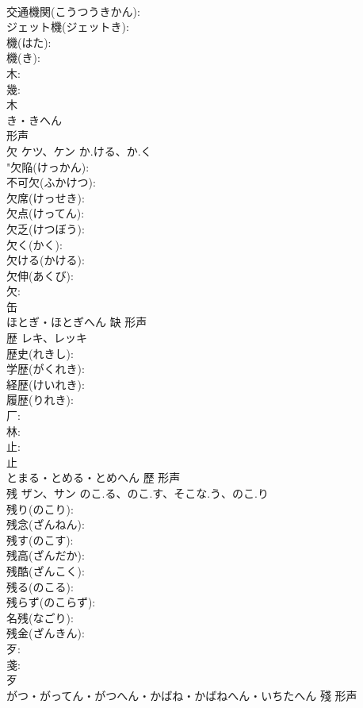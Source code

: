 \documentclass[8pt]{extreport}
\begin{document}
\begin{CJK}{UTF8}{min}
\\	交通機関(こうつうきかん): 
\\	ジェット機(ジェットき): 
\\	機(はた): 
\\	機(き): 
\\	木: 
\\	幾: 
\\	木	
\\	き・きへん	
\\	形声 
\\	欠	ケツ、ケン	か.ける、か.く		
\\	"欠陥(けっかん): 
\\	不可欠(ふかけつ): 
\\	欠席(けっせき): 
\\	欠点(けってん): 
\\	欠乏(けつぼう): 
\\	欠く(かく): 
\\	欠ける(かける): 
\\	欠伸(あくび): 
\\	欠: 
\\	缶	
\\	ほとぎ・ほとぎへん	缺	形声 
\\	歴	レキ、レッキ			
\\	歴史(れきし): 
\\	学歴(がくれき): 
\\	経歴(けいれき): 
\\	履歴(りれき): 
\\	厂: 
\\	林: 
\\	止: 
\\	止	
\\	とまる・とめる・とめへん	歷	形声 
\\	残	ザン、サン	のこ.る、のこ.す、そこな.う、のこ.り		
\\	残り(のこり): 
\\	残念(ざんねん): 
\\	残す(のこす): 
\\	残高(ざんだか): 
\\	残酷(ざんこく): 
\\	残る(のこる): 
\\	残らず(のこらず): 
\\	名残(なごり): 
\\	残金(ざんきん): 
\\	歹: 
\\	戔: 
\\	歹	
\\	がつ・がってん・がつへん・かばね・かばねへん・いちたへん	殘	形声 

\end{CJK}
\end{document}
